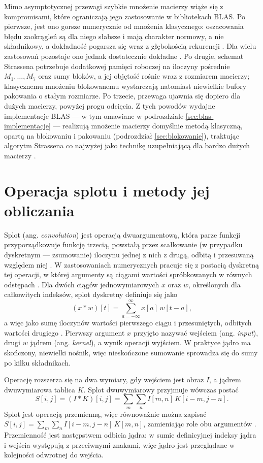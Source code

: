 \documentclass[a4paper,12pt]{book} %
\begin{document}
Mimo asymptotycznej przewagi szybkie mnożenie macierzy wiąże się z kompromisami, które ograniczają jego zastosowanie w bibliotekach BLAS. Po pierwsze, jest ono gorsze numerycznie od mnożenia klasycznego: oszacowania błędu zaokrągleń są dla niego słabsze i mają charakter normowy, a nie składnikowy, a dokładność pogarsza się wraz z głębokością rekurencji \cite{higham1990exploiting}. Dla wielu zastosowań pozostaje ono jednak dostatecznie dokładne \cite{higham1990exploiting}. Po drugie, schemat Strassena potrzebuje dodatkowej pamięci roboczej na iloczyny pośrednie $M_1, \dots, M_7$ oraz sumy bloków, a jej objętość rośnie wraz z rozmiarem macierzy; klasycznemu mnożeniu blokowanemu wystarczają natomiast niewielkie bufory pakowania o stałym rozmiarze. Po trzecie, przewaga ujawnia się dopiero dla dużych macierzy, powyżej progu odcięcia. Z tych powodów wydajne implementacje BLAS --- w tym omawiane w podrozdziale \ref{sec:blas-implementacje} --- realizują mnożenie macierzy domyślnie metodą klasyczną, opartą na blokowaniu i pakowaniu (podrozdział \ref{sec:blokowanie}), traktując algorytm Strassena co najwyżej jako technikę uzupełniającą dla bardzo dużych macierzy \cite{higham1990exploiting,goto2008anatomy}.

\chapter{Operacja splotu i metody jej obliczania}
\label{chap:splot}

Splot (ang. \emph{convolution}) jest operacją dwuargumentową, która parze funkcji przyporządkowuje funkcję trzecią, powstałą przez scałkowanie (w przypadku dyskretnym --- zsumowanie) iloczynu jednej z nich z drugą, odbitą i przesuwaną względem niej \cite{oppenheim2010dtsp}. W zastosowaniach numerycznych pracuje się z postacią dyskretną tej operacji, w której argumenty są ciągami wartości spróbkowanych w równych odstępach \cite{oppenheim2010dtsp}. Dla dwóch ciągów jednowymiarowych $x$ oraz $w$, określonych dla całkowitych indeksów, splot dyskretny definiuje się jako
\[
  (x * w)[t] = \sum_{a=-\infty}^{\infty} x[a]\, w[t - a],
\]
a więc jako sumę iloczynów wartości pierwszego ciągu i przesuniętych, odbitych wartości drugiego \cite{oppenheim2010dtsp}. Pierwszy argument $x$ przyjęto nazywać wejściem (ang. \emph{input}), drugi $w$ jądrem (ang. \emph{kernel}), a wynik operacji wyjściem. W praktyce jądro ma skończony, niewielki nośnik, więc nieskończone sumowanie sprowadza się do sumy po kilku składnikach.

Operację rozszerza się na dwa wymiary, gdy wejściem jest obraz $I$, a jądrem dwuwymiarowa tablica $K$. Splot dwuwymiarowy przyjmuje wówczas postać \cite{goodfellow2016deeplearning}
\[
  S[i, j] = (I * K)[i, j] = \sum_{m} \sum_{n} I[m, n]\, K[i - m, j - n].
\]
Splot jest operacją przemienną, więc równoważnie można zapisać $S[i, j] = \sum_{m} \sum_{n} I[i - m, j - n]\, K[m, n]$, zamieniając role obu argumentów \cite{oppenheim2010dtsp}. Przemienność jest następstwem odbicia jądra: w sumie definicyjnej indeksy jądra i wejścia występują z przeciwnymi znakami, więc jądro jest przeglądane w kolejności odwrotnej do wejścia.
\end{document}
